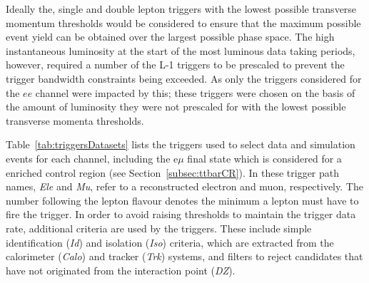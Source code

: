 Ideally the, single and double lepton triggers with the lowest possible transverse momentum thresholds would be considered to ensure that the maximum possible event yield can be obtained over the largest possible phase space.
The high instantaneous luminosity at the start of the most luminous data taking periods, however, required a number of the L-1 triggers to be prescaled to prevent the trigger bandwidth constraints being exceeded.
As only the triggers considered for the $ee$ channel were impacted by this; these triggers were chosen on the basis of the amount of luminosity they were not prescaled for with the lowest possible transverse momenta thresholds.

Table~\ref{tab:triggersDatasets} lists the triggers used to select data and simulation events for each channel, including the e$\mu$ final state which is considered for a \ttbar enriched control region (see Section~\ref{subsec:ttbarCR}).
In these trigger path names, \emph{Ele} and \emph{Mu}, refer to a reconstructed electron and muon, respectively.
The number following the lepton flavour denotes the minimum \pT a lepton must have to fire the trigger.
In order to avoid raising \pT thresholds to maintain the trigger data rate, additional criteria are used by the triggers.
These include simple identification (\emph{Id}) and isolation (\emph{Iso}) criteria, which are extracted from the calorimeter (\emph{Calo}) and tracker (\emph{Trk}) systems, and filters to reject candidates that have not originated from the interaction point (\emph{DZ}).

\begin{table}[h]
\label{tab:triggersDatasets}
  \centering
\end{table}


